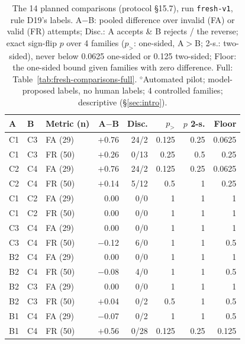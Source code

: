 \begin{table}[t]\centering\footnotesize
\caption{The 14 planned comparisons (protocol \S15.7), run \texttt{fresh-v1}, rule D19's labels. A$-$B: pooled difference over invalid (FA) or valid (FR) attempts; Disc.: A accepts \& B rejects / the reverse; exact sign-flip $p$ over 4 families ($p_{>}$: one-sided, A$>$B; 2-s.: two-sided), never below 0.0625 one-sided or 0.125 two-sided; Floor: the one-sided bound given families with zero difference. Full: Table~\ref{tab:fresh-comparisons-full}. $^{\diamond}$Automated pilot; model-proposed labels, no human labels; 4 controlled families; descriptive (\S\ref{sec:intro}).}\label{tab:fresh-comparisons}
\begin{tabular}{lllrrrrr}\toprule A & B & Metric (n) & A$-$B & Disc. & $p_{>}$ & $p$ 2-s. & Floor \\\midrule
C1 & C3 & FA (29) & \ensuremath{+}0.76 & 24/2 & 0.125 & 0.25 & 0.0625 \\
C1 & C3 & FR (50) & \ensuremath{+}0.26 & 0/13 & 0.25 & 0.5 & 0.25 \\
C2 & C4 & FA (29) & \ensuremath{+}0.76 & 24/2 & 0.125 & 0.25 & 0.0625 \\
C2 & C4 & FR (50) & \ensuremath{+}0.14 & 5/12 & 0.5 & 1 & 0.25 \\
C1 & C2 & FA (29) & 0.00 & 0/0 & 1 & 1 & 1 \\
C1 & C2 & FR (50) & 0.00 & 0/0 & 1 & 1 & 1 \\
C3 & C4 & FA (29) & 0.00 & 0/0 & 1 & 1 & 1 \\
C3 & C4 & FR (50) & \ensuremath{-}0.12 & 6/0 & 1 & 1 & 0.5 \\
B2 & C4 & FA (29) & 0.00 & 0/0 & 1 & 1 & 1 \\
B2 & C4 & FR (50) & \ensuremath{-}0.08 & 4/0 & 1 & 1 & 0.5 \\
B2 & C3 & FA (29) & 0.00 & 0/0 & 1 & 1 & 1 \\
B2 & C3 & FR (50) & \ensuremath{+}0.04 & 0/2 & 0.5 & 1 & 0.5 \\
B1 & C4 & FA (29) & \ensuremath{-}0.07 & 0/2 & 1 & 1 & 0.5 \\
B1 & C4 & FR (50) & \ensuremath{+}0.56 & 0/28 & 0.125 & 0.25 & 0.125 \\
\bottomrule\end{tabular}\end{table}
